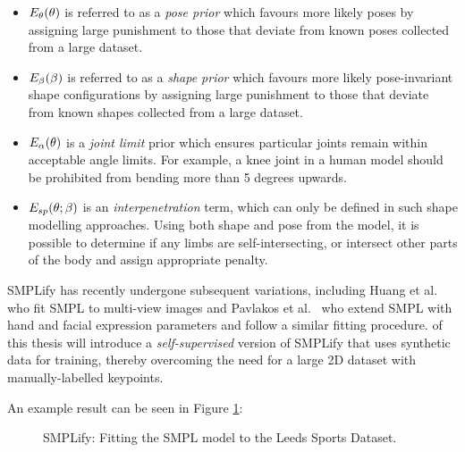     \begin{itemize}
        \item $E_{\theta}(\theta)$ is referred to as a \textit{pose prior} which favours more likely poses by assigning large punishment to those that deviate from known poses collected from a large dataset.
        \item $E_{\beta}(\beta)$ is referred to as a \textit{shape prior} which favours more likely pose-invariant shape configurations by assigning large punishment to those that deviate from known shapes collected from a large dataset. 
        \item $E_{\alpha}(\theta)$ is a \textit{joint limit} prior which ensures particular joints remain within acceptable angle limits. For example, a knee joint in a human model should be prohibited from bending more than 5 degrees upwards.
        \item $E_{sp}(\theta; \beta)$ is an \textit{interpenetration} term, which can only be defined in such shape modelling approaches. Using both shape and pose from the model, it is possible to determine if any limbs are self-intersecting, or intersect other parts of the body and assign appropriate penalty.
    \end{itemize}

    SMPLify has recently undergone subsequent variations, including Huang et al.~ who fit SMPL to multi-view images and Pavlakos et al.~ who extend SMPL with hand and facial expression parameters and follow a similar fitting procedure.  of this thesis will introduce a \emph{self-supervised} version of SMPLify that uses synthetic data for training, thereby overcoming the need for a large 2D dataset with manually-labelled keypoints.

    An example result can be seen in Figure \ref{fig:smplify}:

    \begin{figure}[H] %
        \caption{SMPLify: Fitting the SMPL model to the Leeds Sports Dataset.}
        \label{fig:smplify}
    \end{figure}
        
